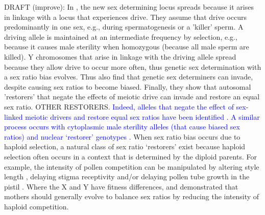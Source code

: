 \documentclass[12pt]{article}
\begin{document}
DRAFT (improve): In \citet{Ubeda:2015fx}, the new sex determining locus spreads because it arises in linkage with a locus that experiences drive. They assume that drive occurs predominantly in one sex, e.g., during spermatogenesis or a 'killer' sperm. A driving allele is maintained at an intermediate frequency by selection, e.g., because it causes male sterility when homozygous (because all male sperm are killed). Y chromosomes that arise in linkage with the driving allele spread because they allow drive to occur more often, thus genetic sex determination with a sex ratio bias evolves. 
Thus \citet{Ubeda:2015fx} also find that genetic sex determiners can invade, despite causing sex ratios to become biased. 
Finally, they show that autosomal 'restorers' that negate the effects of meiotic drive can invade and restore an equal sex ratio. 
OTHER RESTORERS.
\textcolor{blue}{Indeed, alleles that negate the effect of sex-linked meiotic drivers and restore equal sex ratios have been identified \citep{Stalker:1961th,Smith:1975ft}. 
A similar process occurs with cytoplasmic male sterility alleles (that cause biased sex ratios) and nuclear `restorer' genotypes \citep{Frank:1989vl}. 
}
When sex ratio bias occurs due to haploid selection, a natural class of sex ratio `restorers' exist because haploid selection often occurs in a context that is determined by the diploid parents. 
For example, the intensity of pollen competition can be manipulated by altering style length \citep{Travers:2001,Lankinen:2001gc,Ruane:2009vt}, delaying stigma receptivity \citep{Galen:1986wq,Lankinen:2011if} and/or delaying pollen tube growth in the pistil \citep{Herrero:2003jf}. 
Where the X and Y have fitness differences, \citet{Hough:2013uo} and \citet{Otto:2015va} demonstrated that mothers should generally evolve to balance sex ratios by reducing the intensity of haploid competition. 
\end{document}
